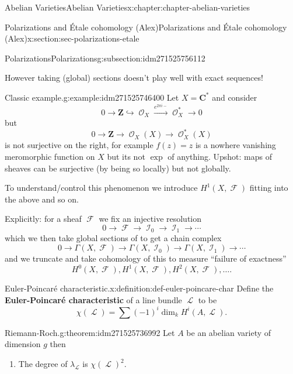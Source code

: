 \documentclass[oneside,10pt,]{book}
\newcommand{\terminology}[1]{\textbf{#1}}
\numberwithin{equation}{section}
\newcommand{\sheaf}[1]{\operatorname{\mathcal{#1}}}
\newcommand{\ZZ}{\mathbf{Z}}
\newcommand{\CC}{\mathbf{C}}
\begin{document}
\begin{chapterptx}{Abelian Varieties}{}{Abelian Varieties}{}{}{x:chapter:chapter-abelian-varieties}
\begin{sectionptx}{Polarizations and Étale cohomology (Alex)}{}{Polarizations and Étale cohomology (Alex)}{}{}{x:section:sec-polarizations-etale}
\begin{subsectionptx}{Polarizations}{}{Polarizations}{}{}{g:subsection:idm271525756112}
\par
However taking (global) sections doesn't play well with exact sequences!%
\begin{example}{Classic example.}{g:example:idm271525746400}%
Let \(X = \CC^*\) and consider%
\begin{equation*}
0 \to \ZZ \hookrightarrow \sheaf O_X \xrightarrow{e^{2\pi i -}} \sheaf O_X^* \to 0
\end{equation*}
but%
\begin{equation*}
0 \to \ZZ \to \sheaf O_X(X) \to \sheaf O_X^*(X)
\end{equation*}
is not surjective on the right, for example \(f(z) = z\) is a nowhere vanishing meromorphic function on \(X\) but its not \(\exp\) of anything. Upshot: maps of sheaves can be surjective (by being so locally) but not globally.%
\end{example}
To understand\slash{}control this phenomenon we introduce \(H^1(X, \sheaf F)\) fitting into the above and so on.%
\par
Explicitly: for a sheaf \(\sheaf F\) we fix an injective resolution%
\begin{equation*}
0\to \sheaf F \to \sheaf I_0 \to \sheaf I_1 \to \cdots
\end{equation*}
which we then take global sections of to get a chain complex%
\begin{equation*}
0\to \Gamma(X,\sheaf F) \to \Gamma(X,\sheaf I_0) \to \Gamma(X,\sheaf I_1) \to \cdots
\end{equation*}
and we truncate and take cohomology of this to measure ``failure of exactness''%
\begin{equation*}
H^0(X, \sheaf F) , H^1(X, \sheaf F) , H^2(X, \sheaf F) , \ldots\text{.}
\end{equation*}
%
\begin{definition}{Euler-Poincaré characteristic.}{x:definition:def-euler-poincare-char}%
Define the \terminology{Euler-Poincaré characteristic} of a line bundle \(\sheaf L\) to be%
\begin{equation*}
\chi(\sheaf L) = \sum (-1)^i \dim_k H^i(A,\sheaf L)\text{.}
\end{equation*}
%
\end{definition}
\begin{theorem}{Riemann-Roch.}{}{g:theorem:idm271525736992}%
Let \(A\) be an abelian variety of dimension \(g\) then%
\begin{enumerate}
\item{}The degree of \(\lambda_{\sheaf L}\) is \(\chi(\sheaf L)^2\).%

\end{enumerate}
\end{theorem}
\end{subsectionptx}
\end{sectionptx}
\end{chapterptx}
\end{document}
